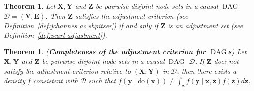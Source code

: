 \documentclass[11pt,a4paper]{article}
\newtheorem{theorem}[definition]{Theorem}
\DeclareMathOperator{\DAG}{DAG}
\newcommand{\g}[1][G]{\mathcal{#1}}
\begin{document}
\begin{theorem}
Let $\mathbf{X,Y}$ and $\mathbf{Z}$ be pairwise disjoint node sets in a causal $\DAG$ $\g[D] = (\mathbf{V},\mathbf{E})$. Then $\mathbf{Z}$ satisfies the adjustment criterion (see Definition~\ref{def:johannes ac shpitser}) if and only if $\mathbf{Z}$ is an adjustment set (see Definition~\ref{def:pearl adjustment}).
\label{theorem:sound and complete ac}
\end{theorem}

\begin{theorem} {(\textbf{Completeness of the adjustment criterion for $\DAG$s})}
Let $\mathbf{X,Y}$ and $\mathbf{Z}$ be pairwise disjoint node sets in a causal $\DAG$ $\g[D]$. If $\mathbf{Z}$ does not satisfy the adjustment criterion relative to $(\mathbf{X,Y})$ in $\g[D]$, then there exists a density $f$ consistent with $\g[D]$ such that $f(\mathbf{y}\mid \text{do}(\mathbf{x})) \neq \int_\mathbf{z}  f(\mathbf{y} \mid \mathbf{x},\mathbf{z})f(\mathbf{z})d\mathbf{z}$.
\label{theorem:completeness ac}
\end{theorem}
\end{document}
